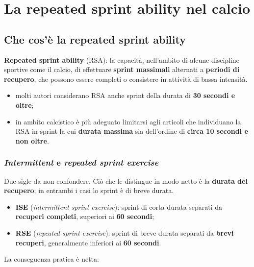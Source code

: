 \chapter{La repeated sprint ability nel calcio}

\section{Che cos'è la repeated sprint ability}

\textbf{Repeated sprint ability} (RSA): la capacità, nell'ambito di alcune discipline sportive come
il calcio, di effettuare \textbf{sprint massimali} alternati a \textbf{periodi di recupero}, che
possono essere completi o consistere in attività di bassa intensità.

\begin{itemize}
  \item molti autori considerano RSA anche sprint della durata di \textbf{30 secondi e oltre};
  \item in ambito calcistico è più adeguato limitarsi agli articoli che individuano la RSA in sprint
    la cui \textbf{durata massima} sia dell'ordine di \textbf{circa 10 secondi e non oltre}.
\end{itemize}

\subsection{\texorpdfstring{\textit{Intermittent} e \textit{repeated sprint exercise}}{Intermittent e repeated sprint exercise}}

Due sigle da non confondere. Ciò che le distingue in modo netto è la \textbf{durata del recupero};
in entrambi i casi lo sprint è di breve durata.

\begin{itemize}
  \item \textbf{ISE} (\textit{intermittent sprint exercise}): sprint di corta durata separati da
    \textbf{recuperi completi}, superiori ai \textbf{60 secondi};
  \item \textbf{RSE} (\textit{repeated sprint exercise}): sprint di breve durata separati da
    \textbf{brevi recuperi}, generalmente inferiori ai \textbf{60 secondi}.
\end{itemize}

La conseguenza pratica è netta:

